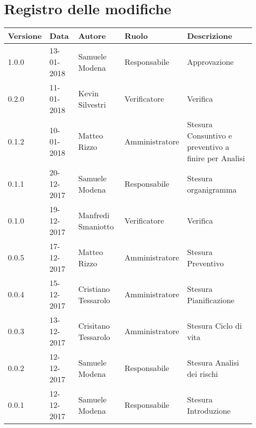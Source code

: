 \documentclass[./PianodiProgetto.tex]{subfiles}
\begin{document}
\chapter*{Registro delle modifiche}
\setlength\LTleft{-22mm}
\begin{longtable}{|p{20mm}|p{20mm}|p{40mm}|p{30mm}|p{50mm}|}
	\hline
	\textbf{Versione} & \textbf{Data} & \textbf{Autore} & \textbf{Ruolo} & \textbf{Descrizione} \\ 
		\hline 1.0.0 & 13-01-2018 & Samuele Modena & Responsabile & Approvazione \\
 
		\hline 0.2.0 & 11-01-2018 & Kevin Silvestri & Verificatore & Verifica \\
 
		\hline 0.1.2 & 10-01-2018 & Matteo Rizzo & Amministratore & Stesura Consuntivo e preventivo a finire per Analisi \\
 
		\hline 0.1.1 & 20-12-2017 & Samuele Modena & Responsabile & Stesura organigramma \\
 
		\hline 0.1.0 & 19-12-2017 & Manfredi Smaniotto & Verificatore & Verifica \\
 
		\hline 0.0.5 & 17-12-2017 & Matteo Rizzo & Amministratore & Stesura Preventivo \\
 
		\hline 0.0.4 & 15-12-2017 & Cristiano Tessarolo & Amministratore & Stesura Pianificazione \\
 
		\hline 0.0.3 & 13-12-2017 & Crisitano Tessarolo & Amministratore & Stesura Ciclo di vita \\
 
		\hline 0.0.2 & 12-12-2017 & Samuele Modena & Responsabile & Stesura Analisi dei rischi \\
 
		\hline 0.0.1 & 12-12-2017 & Samuele Modena & Responsabile & Stesura Introduzione \\
 
		\hline
 
	\end{longtable}
\end{document}
